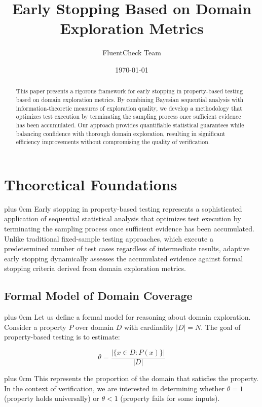 \documentclass[11pt,a4paper]{article}
\title{\LARGE \textbf{Early Stopping Based on Domain Exploration Metrics}}
\author{\large FluentCheck Team}
\date{\today}
\newcommand{\justifytext}{\leftskip=0pt \rightskip=0pt plus 0cm}
\begin{document}
\maketitle

\begin{abstract}
\noindent This paper presents a rigorous framework for early stopping in property-based testing based on domain exploration metrics. By combining Bayesian sequential analysis with information-theoretic measures of exploration quality, we develop a methodology that optimizes test execution by terminating the sampling process once sufficient evidence has been accumulated. Our approach provides quantifiable statistical guarantees while balancing confidence with thorough domain exploration, resulting in significant efficiency improvements without compromising the quality of verification.
\end{abstract}

\section{Theoretical Foundations}

\justifytext
Early stopping in property-based testing represents a sophisticated application of sequential statistical analysis that optimizes test execution by terminating the sampling process once sufficient evidence has been accumulated. Unlike traditional fixed-sample testing approaches, which execute a predetermined number of test cases regardless of intermediate results, adaptive early stopping dynamically assesses the accumulated evidence against formal stopping criteria derived from domain exploration metrics.

\subsection{Formal Model of Domain Coverage}

\justifytext
Let us define a formal model for reasoning about domain exploration. Consider a property $P$ over domain $D$ with cardinality $|D|=N$. The goal of property-based testing is to estimate:

\begin{equation}
\theta = \frac{|\{x \in D : P(x)\}|}{|D|}
\end{equation}

\justifytext
This represents the proportion of the domain that satisfies the property. In the context of verification, we are interested in determining whether $\theta = 1$ (property holds universally) or $\theta < 1$ (property fails for some inputs).
\end{document}
